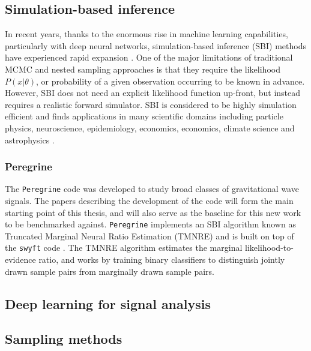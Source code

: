 \subsection{Simulation-based inference}

In recent years, thanks to the enormous rise in machine learning capabilities, particularly with deep neural networks, simulation-based inference (SBI) methods have experienced rapid expansion \cite{Cranmer_SBI_2020}. One of the major limitations of traditional MCMC and nested sampling approaches is that they require the likelihood $P(x|\theta)$, or probability of a given observation occurring to be known in advance. However, SBI does not need an explicit likelihood function up-front, but instead requires a realistic forward simulator. SBI is considered to be highly simulation efficient and finds applications in many scientific domains including particle physics, neuroscience, epidemiology, economics, economics, climate science and astrophysics \cite{Cranmer_SBI_2020}.

\subsubsection{Peregrine}

The \texttt{Peregrine} code was developed to study broad classes of gravitational wave signals. The papers describing the development of the code \cite{bhardwaj2023peregrine,alvey2023things} will form the main starting point of this thesis, and will also serve as the baseline for this new work to be benchmarked against. \texttt{Peregrine} implements an SBI algorithm known as Truncated Marginal Neural Ratio Estimation (TMNRE) \cite{Miller_TMNRE_2021} and is built on top of the \texttt{swyft} code \cite{Miller2022}. The TMNRE algorithm estimates the marginal likelihood-to-evidence ratio, and works by training binary classifiers to distinguish jointly drawn sample pairs from marginally drawn sample pairs.

\subsection{Deep learning for signal analysis}


\subsection{Sampling methods}


